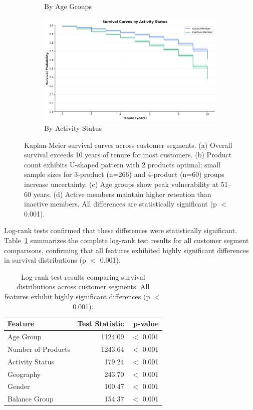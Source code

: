 \documentclass[12pt]{article}
\begin{document}
\begin{figure}[H]
\begin{subfigure}[b]{0.48\textwidth}
\caption{By Age Groups}
\label{fig:survival_age}
\end{subfigure}
\hfill
\begin{subfigure}[b]{0.48\textwidth}
\centering
\includegraphics[width=\textwidth]{../img/12_survival_active_status_plot.png}
\caption{By Activity Status}
\label{fig:survival_active}
\end{subfigure}
\caption{Kaplan-Meier survival curves across customer segments. (a) Overall survival exceeds 10 years of tenure for most customers. (b) Product count exhibits U-shaped pattern with 2 products optimal; small sample sizes for 3‑product (n=266) and 4‑product (n=60) groups increase uncertainty. (c) Age groups show peak vulnerability at 51–60 years. (d) Active members maintain higher retention than inactive members. All differences are statistically significant (p $<$ 0.001).}
\label{fig:survival_all}
\end{figure}

Log‑rank tests confirmed that these differences were statistically significant. Table~\ref{tab:logrank_results} summarizes the complete log‑rank test results for all customer segment comparisons, confirming that all features exhibited highly significant differences in survival distributions (p $<$ 0.001).

\begin{table}[H]
\centering
\small
\caption{Log-rank test results comparing survival distributions across customer segments. All features exhibit highly significant differences (p $<$ 0.001).}
\label{tab:logrank_results}
\begin{tabular}{lrr}
\toprule
\textbf{Feature} & \textbf{Test Statistic} & \textbf{p-value} \\
\midrule
Age Group & 1124.09 & $<$ 0.001 \\
Number of Products & 1243.64 & $<$ 0.001 \\
Activity Status & 179.24 & $<$ 0.001 \\
Geography & 243.70 & $<$ 0.001 \\
Gender & 100.47 & $<$ 0.001 \\
Balance Group & 154.37 & $<$ 0.001 \\
\bottomrule
\end{tabular}
\end{table}
\end{document}
